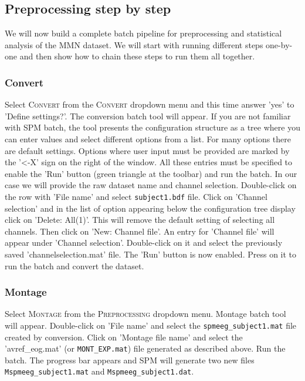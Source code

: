 \subsection{Preprocessing step by step}

We will now build a complete batch pipeline for preprocessing and statistical analysis of the MMN dataset. We will start with running different steps one-by-one and then show how to chain these steps to run them all together.

\subsubsection{Convert}
Select \textsc{Convert} from the \textsc{Convert} dropdown menu and this time answer 'yes' to 'Define settings?'. The conversion batch tool will appear. If you are not familiar with SPM batch, the tool presents the configuration structure as a tree where you can enter values and select different options from a list. For many options there are default settings. Options where user input must be provided are marked by the '<-X' sign on the right of the window. All these entries must be specified to enable the 'Run' button (green triangle at the toolbar) and run the batch. In our case we will provide the raw dataset name and channel selection. Double-click on the row with 'File name' and select \texttt{subject1.bdf} file. Click on 'Channel selection' and in the list of option appearing below the configuration tree display click on 'Delete: All(1)'. This will remove the default setting of selecting all channels. Then click on 'New: Channel file'. An entry for 'Channel file' will appear under 'Channel selection'. Double-click on it and select the previously saved 'channelselection.mat' file. The 'Run' button is now enabled. Press on it to run the batch and convert the dataset.

\subsubsection{Montage}
Select \textsc{Montage} from the \textsc{Preprocessing} dropdown menu. Montage batch tool will appear. Double-click on 'File name' and select the \texttt{spmeeg\_subject1.mat} file created by conversion. Click on 'Montage file name' and select the  'avref\_eog.mat' (or \texttt{MONT\_EXP.mat}) file generated as described above. Run the batch. The progress bar appears and SPM will generate two new files \texttt{Mspmeeg\_subject1.mat} and \texttt{Mspmeeg\_subject1.dat}.

